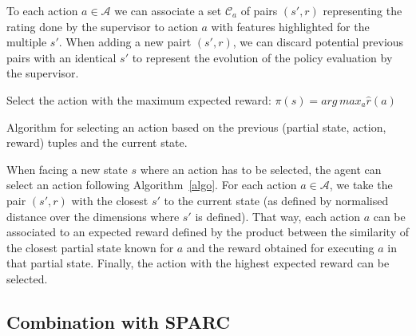 \documentclass[letterpaper]{article} %
\begin{document}
To each action
$a \in \mathcal{A}$ we can associate a set $\mathcal{C}_{a}$ of pairs $(s',r)$
representing the rating done by the supervisor to action $a$ with features
highlighted for the multiple $s'$. When adding a new pairt $(s',r)$, we can discard potential
previous pairs with an identical $s'$ to represent the evolution of the policy
evaluation by the supervisor.

\begin{algorithm}
    \DontPrintSemicolon
    Select the action with the maximum expected reward:
    $\pi(s) = arg\, max_{a} \hat{r}(a)$

    \caption{Algorithm for selecting an action based on the previous
    (partial state, action, reward) tuples and the current state.}
    \label{algo}
\end{algorithm}



When facing a new state $s$ where an action has to be
selected, the agent can select an action following Algorithm~\ref{algo}. For
each action $a \in \mathcal{A}$, we take the pair $(s',r)$ with the closest $s'$
to the current state (as defined by normalised distance over the dimensions
where $s'$ is defined). That way, each action $a$ can be associated to an
expected reward defined by the product between the similarity of the closest
partial state known for $a$ and the reward obtained for executing $a$ in that partial state.
Finally, the action with the highest expected reward can be selected.


\subsection{Combination with SPARC}
\end{document}
